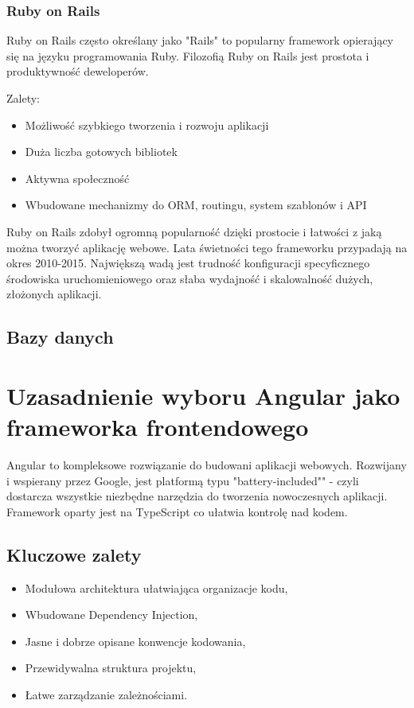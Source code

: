 \subsubsection{Ruby on Rails}

Ruby on Rails często określany jako "Rails" to popularny framework opierający się na języku programowania Ruby. Filozofią Ruby on Rails jest prostota i produktywność deweloperów.


Zalety:
\begin{itemize}
	\item Możliwość szybkiego tworzenia i rozwoju aplikacji
	\item Duża liczba gotowych bibliotek
	\item Aktywna społeczność
	\item Wbudowane mechanizmy do ORM, routingu, system szablonów i API
\end{itemize}


Ruby on Rails zdobył ogromną popularność dzięki prostocie i łatwości z jaką można tworzyć aplikację webowe. Lata świetności tego frameworku przypadają na okres 2010-2015. Największą wadą jest trudność konfiguracji specyficznego środowiska uruchomieniowego oraz słaba wydajność i skalowalność dużych, złożonych aplikacji.

\subsection{Bazy danych}

\section{Uzasadnienie wyboru Angular jako frameworka frontendowego}

Angular to kompleksowe rozwiązanie do budowani aplikacji webowych. Rozwijany i wspierany przez Google, jest platformą typu "battery-included"" - czyli dostarcza wszystkie niezbędne narzędzia do tworzenia nowoczesnych aplikacji. Framework oparty jest na TypeScript co ułatwia kontrolę nad kodem.

\subsection{Kluczowe zalety}
\begin{itemize}
	\item Modułowa architektura ułatwiająca organizacje kodu,
	\item Wbudowane Dependency Injection,
	\item Jasne i dobrze opisane konwencje kodowania,
	\item Przewidywalna struktura projektu,
	\item Łatwe zarządzanie zależnościami.
\end{itemize}

